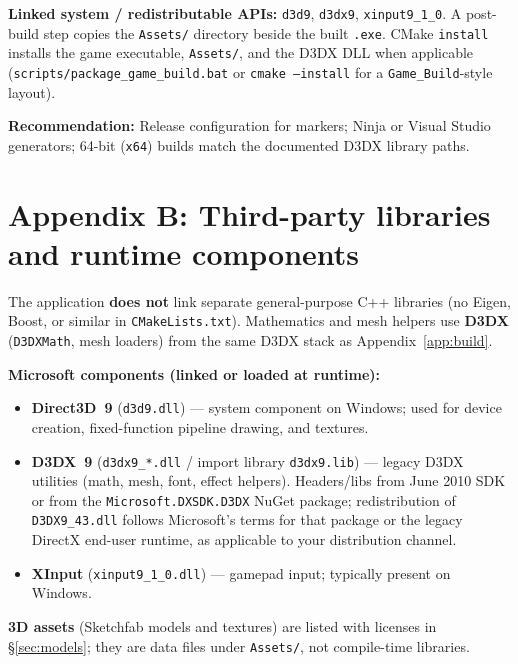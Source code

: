 \documentclass[11pt,a4paper]{article}
\begin{document}
\textbf{Linked system / redistributable APIs:} \texttt{d3d9}, \texttt{d3dx9}, \texttt{xinput9\_1\_0}. A post-build step copies the \texttt{Assets/} directory beside the built \texttt{.exe}. CMake \texttt{install} installs the game executable, \texttt{Assets/}, and the D3DX DLL when applicable (\texttt{scripts/package\_game\_build.bat} or \texttt{cmake --install} for a \texttt{Game\_Build}-style layout).

\textbf{Recommendation:} Release configuration for markers; Ninja or Visual Studio generators; 64-bit (\texttt{x64}) builds match the documented D3DX library paths.

\section{Appendix B: Third-party libraries and runtime components}
\label{app:libs}

The application \textbf{does not} link separate general-purpose C++ libraries (no Eigen, Boost, or similar in \texttt{CMakeLists.txt}). Mathematics and mesh helpers use \textbf{D3DX} (\texttt{D3DXMath}, mesh loaders) from the same D3DX stack as Appendix~\ref{app:build}.

\textbf{Microsoft components (linked or loaded at runtime):}
\begin{itemize}
  \item \textbf{Direct3D~9} (\texttt{d3d9.dll}) --- system component on Windows; used for device creation, fixed-function pipeline drawing, and textures.
  \item \textbf{D3DX~9} (\texttt{d3dx9\_*.dll} / import library \texttt{d3dx9.lib}) --- legacy D3DX utilities (math, mesh, font, effect helpers). Headers/libs from June 2010 SDK or from the \texttt{Microsoft.DXSDK.D3DX} NuGet package; redistribution of \texttt{D3DX9\_43.dll} follows Microsoft's terms for that package or the legacy DirectX end-user runtime, as applicable to your distribution channel.
  \item \textbf{XInput} (\texttt{xinput9\_1\_0.dll}) --- gamepad input; typically present on Windows.
\end{itemize}

\textbf{3D assets} (Sketchfab models and textures) are listed with licenses in \S\ref{sec:models}; they are data files under \texttt{Assets/}, not compile-time libraries.

\clearpage
{}
\vspace*{-4\baselineskip}
\end{document}
